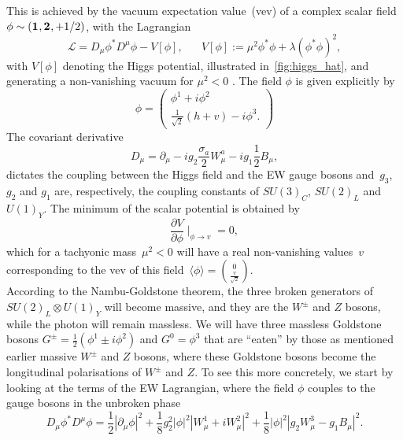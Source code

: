 This is  achieved by the vacuum expectation value~(vev) of a complex scalar field $\phi\sim (\irrep{1},\irrep{2},+1/2)$, with the Lagrangian 
\begin{equation}
	\mathcal{L} = D_\mu \phi^* D^\mu \phi -V[\phi],\;\;\;\;\;\; V[\phi]:= \mu^2  \phi^* \phi +\lambda (\phi^* \phi)^2,
	\label{higgspot}
\end{equation}
with $V[\phi]$ denoting the Higgs potential, illustrated in~\autoref{fig:higgs_hat}, and generating a non-vanishing vacuum for $ \mu^2 <0$ . The field $\phi$ is given explicitly by 
\begin{equation}
	\phi = \begin{pmatrix}
		\phi^1 + i \phi^2\\  \frac{1}{\sqrt{2}}(h+v)-i \phi^3.
	\end{pmatrix}
\end{equation}
The covariant derivative 
\begin{equation}
	D_\mu= \partial_\mu -ig_2\frac{\sigma_a}{2}W^a_\mu-ig_1\frac{1}{2} B_\mu,   
\end{equation}
dictates the coupling between the Higgs field and the EW gauge bosons and~$g_3$, $g_2$ and $g_1$ are, respectively, the coupling constants of 
${ SU(3)_C}$,  ${ SU(2)_L}$ and  ${ U(1)_Y}$.  
The minimum of the scalar potential is obtained by
\begin{equation}
	\frac{\partial V}{\partial \phi} \mid_{\phi\to v} = 0,
\end{equation}
which for a tachyonic mass~$\mu^2 < 0$ will have a real non-vanishing values~$v$ corresponding to the vev of this field~$\langle \phi \rangle ={0\choose \frac{v}{\sqrt{2}}}$.\\
According to the Nambu-Goldstone theorem, the three broken generators of~$SU(2)_L \otimes U(1)_Y$ will become massive, and they are the $W^\pm$ and $Z$ bosons, while the photon will remain massless. We will have three massless Goldstone bosons $ G^\pm=\frac{1}{2} (\phi^1\pm i\phi^2) $ and $G^0=\phi^3$ that are ``eaten'' by those as mentioned earlier massive $W^\pm$ and $Z$ bosons, where these Goldstone bosons become the longitudinal polarisations of  $W^\pm$ and $Z$. To see this more concretely, we start by looking at the terms of the EW Lagrangian, where the field $\phi$ couples to the gauge bosons in the unbroken phase
\begin{equation}
	D_\mu \phi^* D^\mu \phi = \frac{1}{2} |\partial_\mu \phi|^2 + \frac{1}{8}g_2^2|\phi|^2|W_\mu^1+iW_\mu^2|^2
	+ \frac{1}{8}|\phi|^2 |g_2 W_\mu^3- g_1 B_\mu|^2.
	\label{ewhiggs_ub}
\end{equation}
